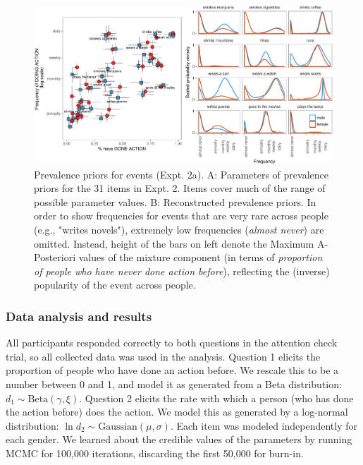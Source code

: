\documentclass[english,,man,floatsintext]{apa6}
\theoremstyle{definition}
\theoremstyle{definition}
\theoremstyle{definition}
\theoremstyle{remark}
\begin{document}
\begin{figure}[!h]
\includegraphics[width=\textwidth]{figs/habituals-prior-figure-1} \caption{Prevalence priors for events (Expt. 2a). A: Parameters of prevalence priors for the 31 items in Expt. 2. Items cover much of the range of possible parameter values. B: Reconstructed prevalence priors. In order to show frequencies for events that are very rare across people (e.g., "writes novels"), extremely low frequencies (\emph{almost never}) are omitted. Instead, height of the bars on left denote the Maximum A-Posteriori values of the mixture component (in terms of \emph{proportion of people who have never done action before}), reflecting the (inverse) popularity of the event across people.}\label{fig:habituals-prior-figure}
\end{figure}

\hypertarget{data-analysis-and-results}{%
\subsubsection{Data analysis and
results}\label{data-analysis-and-results}}

All participants responded correctly to both questions in the attention
check trial, so all collected data was used in the analysis. Question 1
elicits the proportion of people who have done an action before. We
rescale this to be a number between 0 and 1, and model it as generated
from a Beta distribution: \(d_{1} \sim \text{Beta}(\gamma, \xi)\).
Question 2 elicits the rate with which a person (who has done the action
before) does the action. We model this as generated by a log-normal
distribution: \(\ln d_{2} \sim \text{Gaussian}(\mu, \sigma)\). Each item
was modeled independently for each gender. We learned about the credible
values of the parameters by running MCMC for 100,000 iterations,
discarding the first 50,000 for burn-in.
\end{document}
